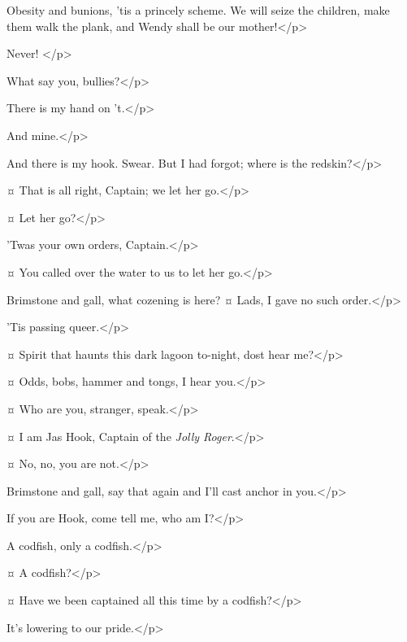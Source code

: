 \hookspeaks
Obesity and bunions, 'tis a princely scheme.
We will seize the children, make them walk the plank, and Wendy shall be our mother!</p>

\wendyspeaks
Never!
</p>

\hookspeaks
What say you, bullies?</p>

\smeespeaks
There is my hand on 't.</p>

\starkeyspeaks
And mine.</p>

\hookspeaks
And there is my hook.
Swear.
But I had forgot; where is the redskin?</p>

\smeespeaks {}¤
That is all right, Captain; we let her go.</p>

\hookspeaks {}¤
Let her go?</p>

\smeespeaks
'Twas your own orders, Captain.</p>

\starkeyspeaks {}¤
You called over the water to us to let her go.</p>

\hookspeaks
Brimstone and gall, what cozening is here?
¤
Lads, I gave no such order.</p>

\smeespeaks
'Tis passing queer.</p>

\hookspeaks {}¤
Spirit that haunts this dark lagoon to-night, dost hear me?</p>

\peterspeaks {}¤
Odds, bobs, hammer and tongs, I hear you.</p>

\hookspeaks {}¤
Who are you, stranger, speak.</p>

\peterspeaks {}¤
I am Jas Hook, Captain of the \emph{Jolly Roger}.</p>

\hookspeaks {}¤
No, no, you are not.</p>

\peterspeaks
Brimstone and gall, say that again and I'll cast anchor in you.</p>

\hookspeaks
If you are Hook, come tell me, who am I?</p>

\peterspeaks
A codfish, only a codfish.</p>

\hookspeaks {}¤
A codfish?</p>

\smeespeaks {}¤
Have we been captained all this time by a codfish?</p>

\starkeyspeaks
It's lowering to our pride.</p>

